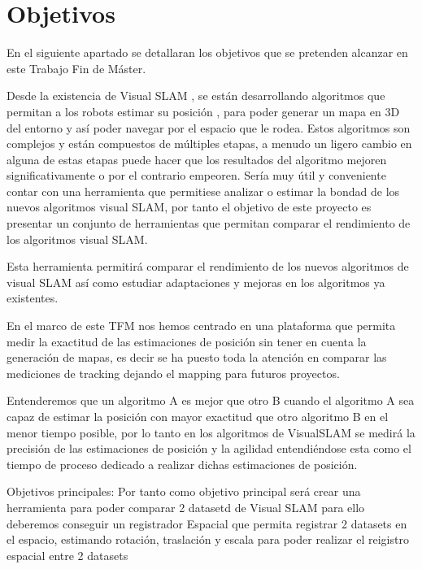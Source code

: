 \chapter{Objetivos} \label{cap:Objetivos}
\setcounter{page}{1}


En el siguiente apartado se detallaran los objetivos que se pretenden alcanzar en este Trabajo Fin de Máster.

Desde la existencia de Visual SLAM , se están desarrollando algoritmos que permitan a los robots estimar su posición , para poder generar un mapa en 3D del entorno y así poder navegar por el espacio que le rodea. Estos algoritmos son complejos y están compuestos de múltiples etapas, a menudo un ligero cambio en alguna de estas etapas puede hacer que los resultados del algoritmo mejoren significativamente o por el contrario empeoren. Sería muy útil y conveniente contar con una herramienta que permitiese analizar o estimar la bondad de los nuevos algoritmos visual SLAM, por tanto el objetivo de este proyecto es presentar un conjunto de herramientas que permitan comparar el rendimiento de los algoritmos visual SLAM.

Esta herramienta permitirá comparar el rendimiento de los nuevos algoritmos de visual SLAM así como estudiar adaptaciones y mejoras en los algoritmos ya existentes.

En el marco de este TFM nos hemos centrado en una plataforma que permita medir la exactitud de las estimaciones de posición sin tener en cuenta la generación de mapas, es decir se ha puesto toda la atención en comparar las mediciones de tracking dejando el mapping para futuros proyectos. 

Entenderemos que un algoritmo A es mejor que otro B cuando el algoritmo A sea capaz de estimar la posición con mayor exactitud que otro algoritmo B en el menor tiempo posible, por lo tanto en los algoritmos de VisualSLAM se medirá la precisión de las estimaciones de posición y la agilidad entendiéndose esta como el tiempo de proceso dedicado a realizar dichas estimaciones de posición. 


Objetivos principales: 
Por tanto como objetivo principal será crear una herramienta para poder comparar 2 datasetd de Visual SLAM
para ello deberemos conseguir un registrador Espacial que permita registrar 2 datasets en el espacio, estimando rotación, traslación y escala para poder realizar el reigistro espacial entre 2 datasets


